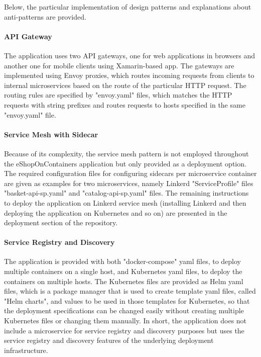 \documentclass{Configuration_Files/PoliMi3i_thesis}
\begin{document}
Below, the particular implementation of design patterns and explanations about anti-patterns are provided.

\paragraph{API Gateway} The application uses two API gateways, one for web applications in browsers and another one for mobile clients using Xamarin-based app.
The gateways are implemented using Envoy\footnotemark[66] proxies, which routes incoming requests from clients to internal microservices based on the route of the particular HTTP request.
The routing rules are specified by "envoy.yaml" files, which matches the HTTP requests with string prefixes and routes requests to hosts specified in the same "envoy.yaml" file.

\paragraph{Service Mesh with Sidecar} Because of its complexity, the service mesh pattern is not employed throughout the eShopOnContainers application but only provided as a deployment option.
The required configuration files for configuring sidecars per microservice container are given as examples for two microservices, namely Linkerd "ServiceProfile" files "basket-api-sp.yaml" and "catalog-api-sp.yaml" files.
The remaining instructions to deploy the application on Linkerd service mesh (installing Linkerd and then deploying the application on Kubernetes and so on) are presented in the deployment section of the repository.

\paragraph{Service Registry and Discovery} The application is provided with both "docker-compose" yaml files, to deploy multiple containers on a single host, and Kubernetes yaml files, to deploy the containers on multiple hosts. 
The Kubernetes files are provided as Helm\footnotemark[67] yaml files, which is a package manager that is used to create template yaml files, called "Helm charts", and values to be used in those templates for Kubernetes, so that the deployment specifications can be changed easily without creating multiple Kubernetes files or changing them manually.
In short, the application does not include a microservice for service registry and discovery purposes but uses the service registry and discovery features of the underlying deployment infrastructure.
\end{document}
